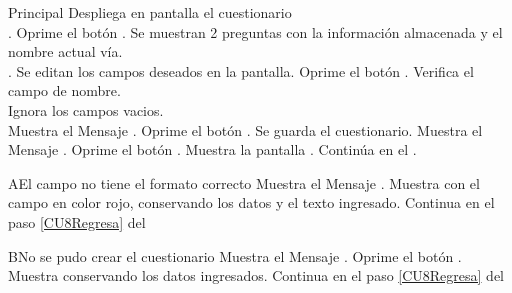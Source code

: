 \begin{UCtrayectoria}{Principal}
    \UCpaso Despliega en pantalla el cuestionario  \label{CU8Continue}
        \\.
    \UCpaso[\UCactor] Oprime el botón .
    \UCpaso[\UCactor] Se muestran 2 preguntas con la información almacenada y el nombre actual vía.
        \\.
    \UCpaso Se editan los campos deseados en la pantalla. \label{CU8Regresa2}   
    \UCpaso[\UCactor] Oprime el botón .    \label{CU8Regresa}
    \UCpaso Verifica el campo de nombre. 
        \\
    \UCpaso Ignora los campos vacios.
        \\
    \UCpaso Muestra el Mensaje \textbf{}.
    \UCpaso[\UCactor] Oprime el botón .
    \UCpaso Se guarda el cuestionario. 
    \UCpaso Muestra el Mensaje \textbf{}.
    \UCpaso[\UCactor] Oprime el botón .
    \UCpaso Muestra la pantalla .
    \UCpaso Continúa en el .
\end{UCtrayectoria}


\begin{UCtrayectoriaA}{A}{El campo no tiene el formato correcto}
    \UCpaso Muestra el Mensaje \textbf{}.
    \UCpaso Muestra  con el campo en color rojo, conservando los datos y el texto ingresado.
    \UCpaso Continua en el paso \ref{CU8Regresa} del 
\end{UCtrayectoriaA}

\begin{UCtrayectoriaA}{B}{No se pudo crear el cuestionario}
    \UCpaso Muestra el Mensaje \textbf{}.
    \UCpaso[\UCactor] Oprime el botón .
    \UCpaso Muestra  conservando los datos ingresados.
    \UCpaso Continua en el paso \ref{CU8Regresa} del 
\end{UCtrayectoriaA}

